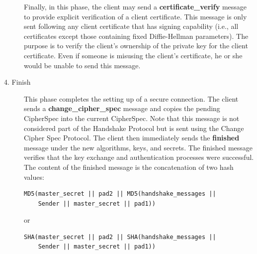 \documentclass[12pt]{article}
\begin{document}
\begin{description}
Finally, in this phase, the client may send a \textbf{certificate\_verify} message to provide explicit verification of a client certificate. This message is only sent following any client certificate that has signing capability (i.e., all certificates except those containing fixed Diffie-Hellman parameters). The purpose is to verify the client's ownership of the private key for the client certificate. Even if someone is misusing the client's certificate, he or she would be unable to send this message.
\item[4. Finish]
This phase completes the setting up of a secure connection. The client sends a \textbf{change\_cipher\_spec} message and copies the pending CipherSpec into the current CipherSpec. Note that this message is not considered part of the Handshake Protocol but is sent using the Change Cipher Spec Protocol. The client then immediately sends the \textbf{finished} message under the new algorithms, keys, and secrets. The finished message verifies that the key exchange and authentication processes were successful. The content of the finished message is the concatenation of two hash values:
\begin{verbatim}
MD5(master_secret || pad2 || MD5(handshake_messages ||
    Sender || master_secret || pad1))    
\end{verbatim}
or
\begin{verbatim}
SHA(master_secret || pad2 || SHA(handshake_messages ||
    Sender || master_secret || pad1))
\end{verbatim}


\end{description}
\end{document}
